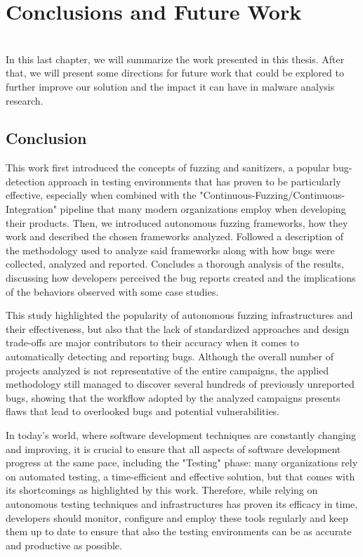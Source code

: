 \chapter{Conclusions and Future Work} \label{chap_5}
\ \\

In this last chapter, we will summarize the work presented in this thesis. After that, we will present some directions for future work that could be explored to further improve our solution and the impact it can have in malware analysis research.

\section{Conclusion}
This work first introduced the concepts of fuzzing and sanitizers, a popular bug-detection approach in testing environments that has proven to be particularly effective, especially when combined with the "Continuous-Fuzzing/Continuous-Integration" pipeline that many modern organizations employ when developing their products. Then, we introduced autonomous fuzzing frameworks, how they work and described the chosen frameworks analyzed. Followed a description of the methodology used to analyze said frameworks along with how bugs were collected, analyzed and reported. Concludes a thorough analysis of the results, discussing how developers perceived the bug reports created and the implications of the behaviors observed with some case studies.

This study highlighted the popularity of autonomous fuzzing infrastructures and their effectiveness, but also that the lack of standardized approaches and design trade-offs are major contributors to their accuracy when it comes to automatically detecting and reporting bugs. Although the overall number of projects analyzed is not representative of the entire campaigns, the applied methodology still managed to discover several hundreds of previously unreported bugs, showing that the workflow adopted by the analyzed campaigns presents flaws that lead to overlooked bugs and potential vulnerabilities.

In today's world, where software development techniques are constantly changing and improving, it is crucial to ensure that all aspects of software development progress at the same pace, including the "Testing" phase: many organizations rely on automated testing, a time-efficient and effective solution, but that comes with its shortcomings as highlighted by this work. Therefore, while relying on autonomous testing techniques and infrastructures has proven its efficacy in time, developers should monitor, configure and employ these tools regularly and keep them up to date to ensure that also the testing environments can be as accurate and productive as possible.



